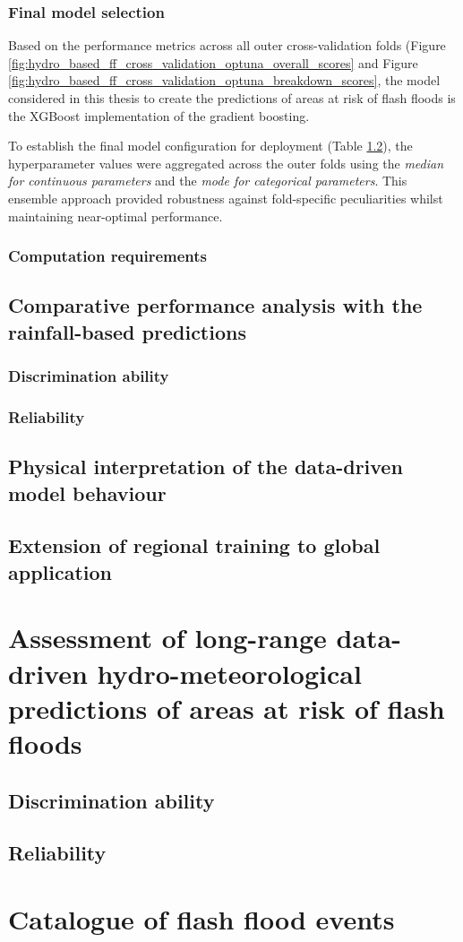 \subsubsection{Final model selection}

Based on the performance metrics across all outer cross-validation folds (Figure \ref{fig:hydro_based_ff_cross_validation_optuna_overall_scores} and Figure \ref{fig:hydro_based_ff_cross_validation_optuna_breakdown_scores}, the model considered in this thesis to create the predictions of areas at risk of flash floods is the XGBoost implementation of the gradient boosting.

To establish the final model configuration for deployment (Table \ref{}), the hyperparameter values were aggregated across the outer folds using the \textit{median for continuous parameters} and the \textit{mode for categorical parameters}. This ensemble approach provided robustness against fold-specific peculiarities whilst maintaining near-optimal performance. 


\subsubsection{Computation requirements}




\subsection{Comparative performance analysis with the rainfall-based predictions}
\subsubsection{Discrimination ability}
\subsubsection{Reliability}

\subsection{Physical interpretation of the data-driven model behaviour}

\subsection{Extension of regional training to global application}


\section{Assessment of long-range data-driven hydro-meteorological predictions of areas at risk of flash floods}
\label{verif_data_driven_long_fc}

\subsection{Discrimination ability}

\subsection{Reliability}


\section{Catalogue of flash flood events}
\label{verif_case_study}